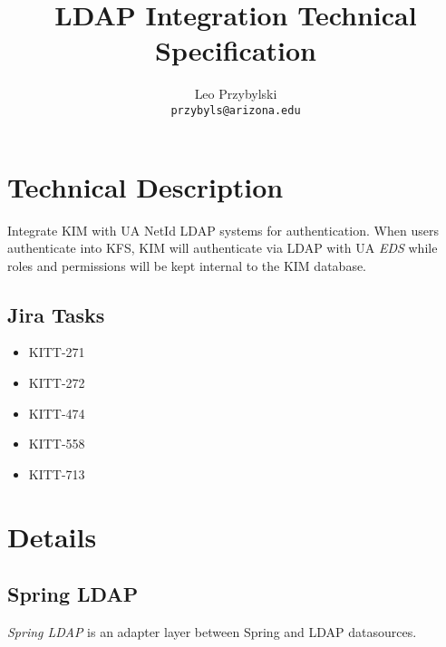 \documentclass[12pt,notitlepage]{article}
\author{Leo Przybylski \\
\texttt{przybyls@arizona.edu}}
\title{LDAP Integration Technical Specification}
\begin{document}
\maketitle
\tableofcontents

\lstset{basicstyle=\small,
  breaklines=true,
  includerangemarker=false}
\section{Technical Description}
Integrate KIM with UA NetId LDAP systems for authentication. When users authenticate into KFS, KIM will authenticate via LDAP with UA \emph{EDS} 
while roles and permissions will be kept internal to the KIM database.

\subsection{Jira Tasks}
\begin{itemize}
  \item KITT-271
  \item KITT-272
  \item KITT-474
  \item KITT-558
  \item KITT-713
\end{itemize}


\section{Details}

\subsection{Spring LDAP}
\emph{Spring LDAP} is an adapter layer between Spring and LDAP datasources. 
\end{document}
